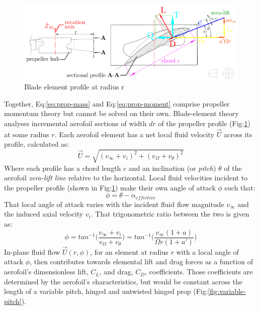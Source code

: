 \begin{figure}[hbtp]
\vspace{-15pt}
\centering
\includegraphics[width=\textwidth]{figs/bem-profile}
\caption{Blade element profile at radius r}
\label{fig:bem-profile}
\end{figure}
\par
Together, Eq:\ref{eq:prop-mass} and Eq:\ref{eq:prop-moment} comprise propeller momentum theory but cannot be solved on their own. Blade-element theory analyses incremental aerofoil sections of width $dr$ of the propeller profile (Fig:\ref{fig:bem-profile}) at some radius $r$. Each aerofoil element has a net local fluid velocity $\vec{U}$ across its profile, calculated as:
\begin{equation}
\vec{U}=\sqrt{(v_\infty+v_i)^2+(v_\Omega+v_\theta)^2}
\end{equation}
Where each profile has a chord length $c$ and an inclination (or \emph{pitch}) $\theta$ of the aerofoil \emph{zero-lift line} relative to the horizontal. Local fluid velocities incident to the propeller profile (shown in Fig:\ref{fig:bem-profile}) make their own angle of attack $\phi$ such that:
\begin{equation}
\phi=\theta-\alpha_{effective}
\end{equation}
That local angle of attack varies with the incident fluid flow magnitude $v_\infty$ and the induced axial velocity $v_i$. That trigonometric ratio between the two is given as:
\begin{equation}
\phi=tan^{-1}\bigg(\frac{v_\infty+v_i}{v_\Omega+v_\theta}\bigg)=tan^{-1}\bigg(\frac{v_\infty(1+a)}{\Omega r(1+a')}\bigg)
\end{equation}
In-plane fluid flow $\vec{U}(r,\phi)$, for an element at radius $r$ with a local angle of attack $\phi$, then contributes towards elemental lift and drag forces as a function of aerofoil's dimensionless lift, $C_L$, and drag, $C_D$, coefficients. Those coefficients are determined by the aerofoil's characteristics, but would be constant across the length of a variable pitch, hinged and untwisted hinged prop (Fig:\ref{fig:variable-pitch}).
